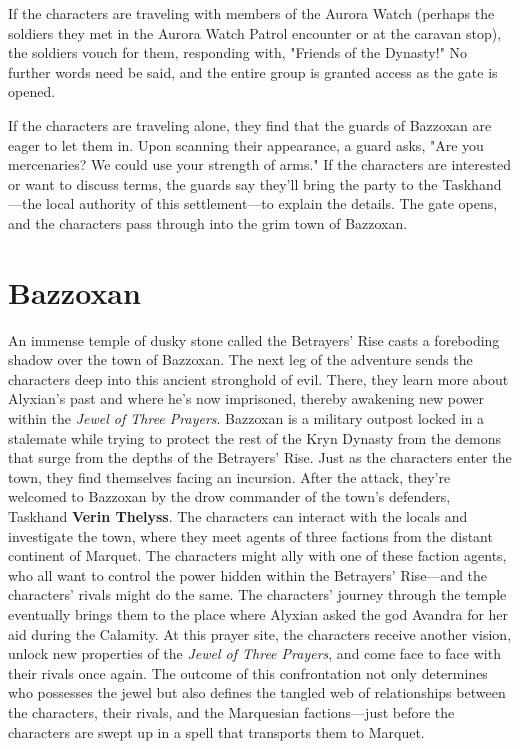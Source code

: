 \documentclass[letterpaper, 11pt, bg=full, twocolumn]{dndbook}
\begin{document}
If the characters are traveling with members of the Aurora Watch (perhaps the soldiers they met in the Aurora Watch Patrol encounter or at the caravan stop), the soldiers vouch for them, responding with, "Friends of the Dynasty!" No further words need be said, and the entire group is granted access as the gate is opened.

If the characters are traveling alone, they find that the guards of Bazzoxan are eager to let them in. Upon scanning their appearance, a guard asks, "Are you mercenaries? We could use your strength of arms." If the characters are interested or want to discuss terms, the guards say they'll bring the party to the Taskhand---the local authority of this settlement---to explain the details. The gate opens, and the characters pass through into the grim town of Bazzoxan.

\chapter{Bazzoxan}\label{ch:bazzoxan-4-4}

An immense temple of dusky stone called the Betrayers' Rise casts a foreboding shadow over the town of Bazzoxan. The next leg of the adventure sends the characters deep into this ancient stronghold of evil. There, they learn more about Alyxian's past and where he's now imprisoned, thereby awakening new power within the \textit{Jewel of Three Prayers}.
Bazzoxan is a military outpost locked in a stalemate while trying to protect the rest of the Kryn Dynasty from the demons that surge from the depths of the Betrayers' Rise. Just as the characters enter the town, they find themselves facing an incursion. After the attack, they're welcomed to Bazzoxan by the drow commander of the town's defenders, Taskhand \textbf{Verin Thelyss}.
The characters can interact with the locals and investigate the town, where they meet agents of three factions from the distant continent of Marquet. The characters might ally with one of these faction agents, who all want to control the power hidden within the Betrayers' Rise---and the characters' rivals might do the same. The characters' journey through the temple eventually brings them to the place where Alyxian asked the god Avandra for her aid during the Calamity.
At this prayer site, the characters receive another vision, unlock new properties of the \textit{Jewel of Three Prayers}, and come face to face with their rivals once again. The outcome of this confrontation not only determines who possesses the jewel but also defines the tangled web of relationships between the characters, their rivals, and the Marquesian factions---just before the characters are swept up in a spell that transports them to Marquet.
\end{document}
